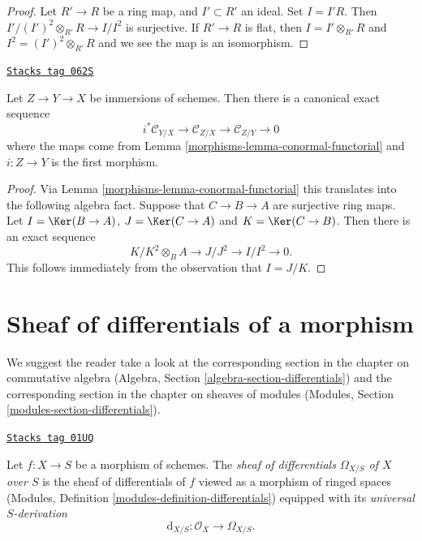 \begin{proof}
Let $R' \to R$ be a ring map, and $I' \subset R'$ an ideal.
Set $I = I'R$. Then $I'/(I')^2 \otimes_{R'} R \to I/I^2$ is
surjective. If $R' \to R$ is flat, then $I = I' \otimes_{R'} R$
and $I^2 = (I')^2 \otimes_{R'} R$ and we see the map is an
isomorphism.
\end{proof}

\begin{lemma}
\label{morphisms-lemma-transitivity-conormal}
\href{https://stacks.math.columbia.edu/tag/062S}{\texttt{Stacks tag 062S}}

Let $Z \to Y \to X$ be immersions of schemes. Then there is a canonical
exact sequence
$$
i^*\mathcal{C}_{Y/X} \to
\mathcal{C}_{Z/X} \to
\mathcal{C}_{Z/Y} \to 0
$$
where the maps come from
Lemma \ref{morphisms-lemma-conormal-functorial}
and $i : Z \to Y$ is the first morphism.
\end{lemma}

\begin{proof}

Via
Lemma \ref{morphisms-lemma-conormal-functorial}
this translates into the following algebra fact. Suppose that
$C \to B \to A$ are surjective ring maps. Let $I = \Ker(B \to A)$,
$J = \Ker(C \to A)$ and $K = \Ker(C \to B)$. Then
there is an exact sequence
$$
K/K^2 \otimes_B A \to J/J^2 \to I/I^2 \to 0.
$$
This follows immediately from the observation that $I = J/K$.
\end{proof}

\section{Sheaf of differentials of a morphism}
\label{morphisms-section-sheaf-differentials}
We suggest the reader take a look at the corresponding section
in the chapter on commutative algebra
(Algebra, Section \ref{algebra-section-differentials})
and the corresponding section in the chapter on sheaves of modules
(Modules, Section \ref{modules-section-differentials}).

\begin{definition}
\label{morphisms-definition-sheaf-differentials}
\href{https://stacks.math.columbia.edu/tag/01UQ}{\texttt{Stacks tag 01UQ}}

Let $f : X \to S$ be a morphism of schemes.
The {\it sheaf of differentials $\Omega_{X/S}$ of $X$ over $S$} is
the sheaf of differentials of $f$ viewed as a morphism of ringed spaces
(Modules, Definition \ref{modules-definition-differentials})
equipped with its {\it universal $S$-derivation}
$$
\text{d}_{X/S} : \mathcal{O}_X \longrightarrow \Omega_{X/S}.
$$
\end{definition}

